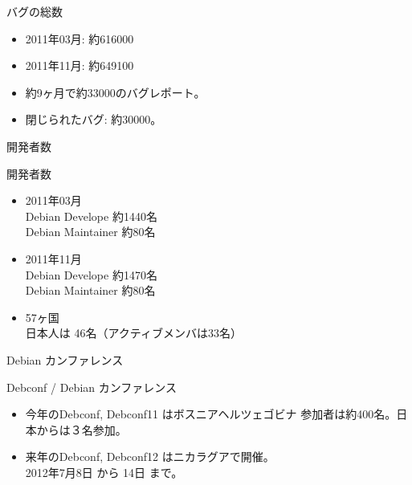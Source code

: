\begin{frame}{バグの総数}
\begin{itemize}[<+->]
\item 2011年03月: 約616000
\item 2011年11月: 約649100
\item 約9ヶ月で約33000のバグレポート。
\item 閉じられたバグ: 約30000。
\end{itemize}

\end{frame}

\begin{frame}
\begin{center}
\LARGE{開発者数}
\end{center}
\end{frame}


\begin{frame}{開発者数}
\begin{itemize}[<+->]
\item 2011年03月\\
Debian Develope 約1440名 \\
Debian Maintainer 約80名

\item 2011年11月\\
Debian Develope 約1470名 \\
Debian Maintainer 約80名

\item 57ヶ国\\
日本人は 46名（アクティブメンバは33名）

\end{itemize}
\end{frame}

\begin{frame}
\begin{center}
\LARGE{Debian カンファレンス}
\end{center}
\end{frame}

\begin{frame}{Debconf / Debian カンファレンス}
\begin{itemize}
\item 今年のDebconf, Debconf11 はボスニアヘルツェゴビナ
参加者は約400名。日本からは３名参加。

\item 来年のDebconf, Debconf12 はニカラグアで開催。\\
2012年7月8日 から 14日 まで。
\end{itemize}
\end{frame}



